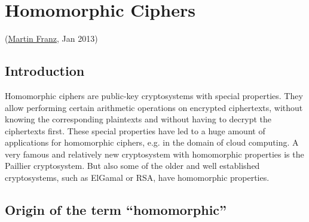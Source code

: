 
\begin{bibunit}[babalpha] %

\newpage
\hypertarget{Chapter_HomomorphicCiphers}{}
\chapter{Homomorphic Ciphers}
\label{Chapter_HomomorphicCiphers}
(\hyperlink{author_Martin-Franz}{Martin Franz}, Jan 2013)

\section{Introduction}

Homomorphic ciphers are public-key cryptosystems with special properties. They allow performing certain arithmetic operations on encrypted ciphertexts, without knowing the corresponding plaintexts and without having to decrypt the ciphertexts first. These special properties have led to a huge amount of applications for homomorphic ciphers, e.g. in the domain of cloud computing. A very famous and relatively new cryptosystem with homomorphic properties is the Paillier cryptosystem. But also some of the older and well established cryptosystems, such as ElGamal or RSA, have homomorphic properties.


\section{Origin of the term ``homomorphic''}


\end{bibunit}
